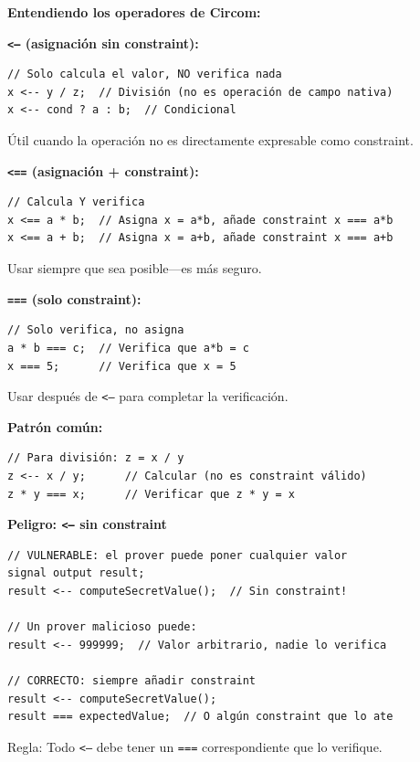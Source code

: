 \documentclass[11pt,a4paper,twoside,openright]{book}
\theoremstyle{definition}
\theoremstyle{plain}
\theoremstyle{remark}
\begin{document}
\begin{keyidea}
\textbf{Entendiendo los operadores de Circom:}

\textbf{\texttt{<--} (asignación sin constraint):}
\begin{verbatim}
// Solo calcula el valor, NO verifica nada
x <-- y / z;  // División (no es operación de campo nativa)
x <-- cond ? a : b;  // Condicional
\end{verbatim}
Útil cuando la operación no es directamente expresable como constraint.

\textbf{\texttt{<==} (asignación + constraint):}
\begin{verbatim}
// Calcula Y verifica
x <== a * b;  // Asigna x = a*b, añade constraint x === a*b
x <== a + b;  // Asigna x = a+b, añade constraint x === a+b
\end{verbatim}
Usar siempre que sea posible---es más seguro.

\textbf{\texttt{===} (solo constraint):}
\begin{verbatim}
// Solo verifica, no asigna
a * b === c;  // Verifica que a*b = c
x === 5;      // Verifica que x = 5
\end{verbatim}
Usar después de \texttt{<--} para completar la verificación.

\textbf{Patrón común:}
\begin{verbatim}
// Para división: z = x / y
z <-- x / y;      // Calcular (no es constraint válido)
z * y === x;      // Verificar que z * y = x
\end{verbatim}
\end{keyidea}

\begin{advertencia}
\textbf{Peligro: \texttt{<--} sin constraint}

\begin{verbatim}
// VULNERABLE: el prover puede poner cualquier valor
signal output result;
result <-- computeSecretValue();  // Sin constraint!

// Un prover malicioso puede:
result <-- 999999;  // Valor arbitrario, nadie lo verifica

// CORRECTO: siempre añadir constraint
result <-- computeSecretValue();
result === expectedValue;  // O algún constraint que lo ate
\end{verbatim}

Regla: Todo \texttt{<--} debe tener un \texttt{===} correspondiente que lo verifique.
\end{advertencia}

\end{document}
